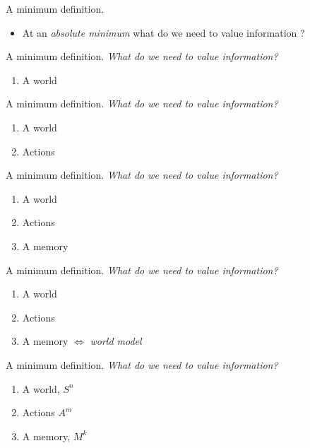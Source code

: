 \documentclass[10pt]{beamer}
\begin{document}
\begin{frame}[fragile]{A minimum definition.}
\begin{itemize}
    \item At an \textit{absolute minimum} what do we need to value information ?
\end{itemize}
\end{frame}

\begin{frame}[fragile]{A minimum definition.}
\textit{What do we need to value information?}
\begin{enumerate}
    \item A world
\end{enumerate}
\end{frame}

\begin{frame}[fragile]{A minimum definition.}
\textit{What do we need to value information?}
\begin{enumerate}
    \item A world
    \item Actions
\end{enumerate}
\end{frame}

\begin{frame}[fragile]{A minimum definition.}
\textit{What do we need to value information?}
\begin{enumerate}
    \item A world
    \item Actions
    \item A memory
\end{enumerate}
\end{frame}

\begin{frame}[fragile]{A minimum definition.}
\textit{What do we need to value information?}
\begin{enumerate}
    \item A world
    \item Actions
    \item A memory $\Leftrightarrow$ \textit{world model}
\end{enumerate}
\end{frame}


\begin{frame}[fragile]{A minimum definition.}
\textit{What do we need to value information?}
\begin{enumerate}
    \item A world, $S^n$
    \item Actions $A^m$
    \item A memory, $M^k$
\end{enumerate}
\end{frame}
\end{document}
